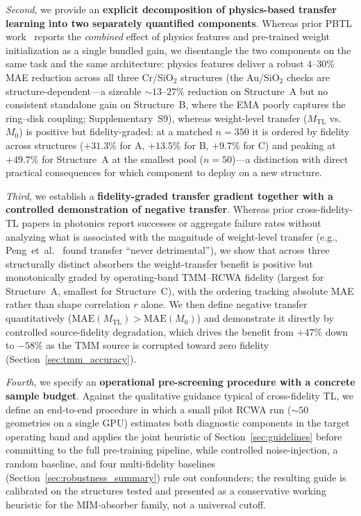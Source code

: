 \documentclass[a4paper,fleqn]{cas-sc}
\newcommand{\Mzero}{M_0}
\newcommand{\Mtl}{M_\text{TL}}
\begin{document}
\emph{Second}, we provide an \textbf{explicit decomposition of physics-based transfer learning into two separately quantified components}. Whereas prior PBTL work~\cite{chen2024tl_mdn,kim2025pbtl,peng2024nanophotonics} reports the \emph{combined} effect of physics features and pre-trained weight initialization as a single bundled gain, we disentangle the two components on the same task and the same architecture: physics features deliver a robust $4$--$30\%$ MAE reduction across all three Cr/SiO$_2$ structures (the Au/SiO$_2$ checks are structure-dependent---a sizeable ${\sim}13$--$27\%$ reduction on Structure~A but no consistent standalone gain on Structure~B, where the EMA poorly captures the ring--disk coupling; Supplementary~S9), whereas weight-level transfer ($\Mtl$ vs.\ $\Mzero$) is positive but fidelity-graded: at a matched $n=350$ it is ordered by fidelity across structures ($+31.3\%$ for A, $+13.5\%$ for B, $+9.7\%$ for C) and peaking at $+49.7\%$ for Structure~A at the smallest pool ($n=50$)---a distinction with direct practical consequences for which component to deploy on a new structure.

\emph{Third}, we establish a \textbf{fidelity-graded transfer gradient together with a controlled demonstration of negative transfer}. Whereas prior cross-fidelity-TL papers in photonics report successes or aggregate failure rates without analyzing what is associated with the magnitude of weight-level transfer (e.g., Peng~et~al.~\cite{peng2024nanophotonics} found transfer ``never detrimental''), we show that across three structurally distinct absorbers the weight-transfer benefit is positive but monotonically graded by operating-band TMM--RCWA fidelity (largest for Structure~A, smallest for Structure~C), with the ordering tracking absolute MAE rather than shape correlation $r$ alone. We then define negative transfer quantitatively ($\mathrm{MAE}(M_\text{TL}) > \mathrm{MAE}(M_0)$) and demonstrate it directly by controlled source-fidelity degradation, which drives the benefit from $+47\%$ down to $-58\%$ as the TMM source is corrupted toward zero fidelity (Section~\ref{sec:tmm_accuracy}).

\emph{Fourth}, we specify an \textbf{operational pre-screening procedure with a concrete sample budget}. Against the qualitative guidance typical of cross-fidelity TL, we define an end-to-end procedure in which a small pilot RCWA run (${\sim}50$ geometries on a single GPU) estimates both diagnostic components in the target operating band and applies the joint heuristic of Section~\ref{sec:guidelines} before committing to the full pre-training pipeline, while controlled noise-injection, a random baseline, and four multi-fidelity baselines (Section~\ref{sec:robustness_summary}) rule out confounders; the resulting guide is calibrated on the structures tested and presented as a conservative working heuristic for the MIM-absorber family, not a universal cutoff.
\end{document}
